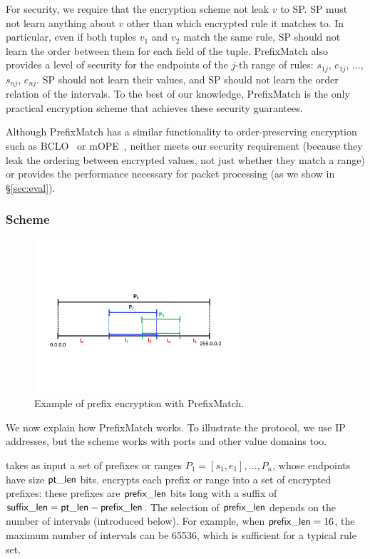 For security, we require that the encryption scheme not leak $v$ to SP.
SP must not learn anything about $v$ other than which encrypted rule it matches to. 
In particular, even if both tuples $v_1$ and $v_2$ match the same rule, SP should not learn the order between them for each field of the tuple.
PrefixMatch also provides a level of security for the endpoints of the $j$-th range of rules:
 $s_{1j}$, $e_{1j}$, $\dots$, $s_{nj}$, $e_{nj}$. SP should not learn their values, and SP should not learn the order relation of the intervals. To the best of our knowledge, PrefixMatch is the only practical encryption scheme that achieves these security guarantees.

Although PrefixMatch has a similar functionality to order-preserving encryption such as BCLO~\cite{boldyreva:ope} or mOPE~\cite{popa:mope}, neither meets our security requirement (because they leak the ordering between encrypted values, not just whether they match a range) or provides the performance necessary for packet processing (as we show in \S\ref{sec:eval}).

\subsubsection{Scheme} 
\label{sec:rmscheme}

\begin{figure}[t]
  \centering
  \includegraphics[width=3in]{fig/rangeopts3.pdf}
  \caption[]{Example of prefix encryption with PrefixMatch.\label{fig:rangeopts3}}
\end{figure}

We now explain how PrefixMatch works. To illustrate the protocol, we use IP addresses, but the scheme works with 
ports and other value domains too.



 \pmatch{} takes as input a set of prefixes or ranges $P_1 = [s_1, e_1], \dots, P_n$, 
whose endpoints have size $\mathsf{pt\_len}$ bits. \pmatch{} encrypts each prefix or range into a set of encrypted prefixes: these prefixes are $\mathsf{prefix\_len}$ bits long with a suffix of $\mathsf{suffix\_len} = \mathsf{pt\_len} - \mathsf{prefix\_len}$. The selection of $\mathsf{prefix\_len}$ depends on the number of intervals (introduced below). For example, when $\mathsf{prefix\_len} = 16$, the maximum number of intervals can be 65536, which is sufficient for a typical rule set.

